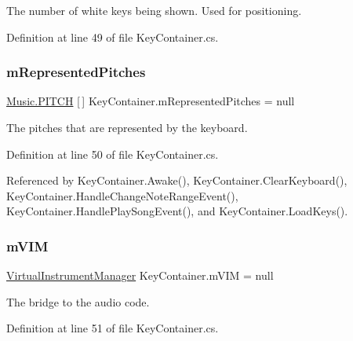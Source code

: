 The number of white keys being shown. Used for positioning. 



Definition at line 49 of file Key\+Container.\+cs.

\mbox{\label{group___key_contain_priv_var_ga103945a6efe3469191e5253d13fec5be}} 
\subsubsection{\texorpdfstring{m\+Represented\+Pitches}{mRepresentedPitches}}
{\footnotesize\ttfamily \hyperlink{group___music_enums_ga508f69b199ea518f935486c990edac1d}{Music.\+P\+I\+T\+CH} \mbox{[}$\,$\mbox{]} Key\+Container.\+m\+Represented\+Pitches = null\hspace{0.3cm}{\ttfamily [private]}}



The pitches that are represented by the keyboard. 



Definition at line 50 of file Key\+Container.\+cs.



Referenced by Key\+Container.\+Awake(), Key\+Container.\+Clear\+Keyboard(), Key\+Container.\+Handle\+Change\+Note\+Range\+Event(), Key\+Container.\+Handle\+Play\+Song\+Event(), and Key\+Container.\+Load\+Keys().

\mbox{\label{group___key_contain_priv_var_ga57ee3824e2f284403bb70ad9c4dfd307}} 
\subsubsection{\texorpdfstring{m\+V\+IM}{mVIM}}
{\footnotesize\ttfamily \hyperlink{class_virtual_instrument_manager}{Virtual\+Instrument\+Manager} Key\+Container.\+m\+V\+IM = null\hspace{0.3cm}{\ttfamily [private]}}



The bridge to the audio code. 



Definition at line 51 of file Key\+Container.\+cs.

